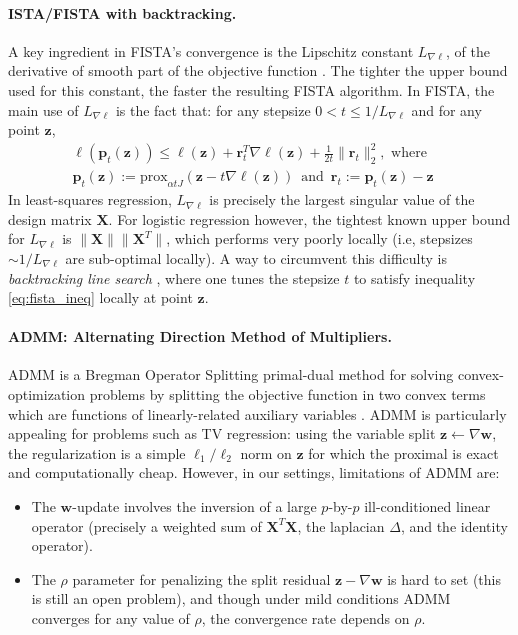 \paragraph{ISTA/FISTA with backtracking.}
A key ingredient in FISTA's convergence is the Lipschitz
constant $L_{\nabla \ell}$, of the derivative of smooth part of the objective function
. The tighter the upper bound used for this constant,
the faster the resulting FISTA algorithm. In FISTA, the main use of 
$L_{\nabla \ell}$ is the fact that: for any
stepsize $0 < t \le 1/L_{\nabla \ell}$ and for any point $\mathbf{z}$,
\begin{equation}%
  \begin{gathered}
    \ell(\mathbf{p}_{t}(\mathbf{z})) \le
    \ell(\mathbf{z}) + \mathbf{r}_{t}^T\nabla
    \ell(\mathbf{z}) + \frac{1}{2t} \|\mathbf{r}_{t}\|_{2}^2,
    \text{  where} \quad\\
    \mathbf{p}_{t}(\mathbf{z}) := \textrm{prox}_{\alpha t J}(\mathbf{z} - t
    \nabla \ell(\mathbf{z})) \,\text{  and  }\,
    \mathbf{r}_{t} :=
    \mathbf{p}_{t}(\mathbf{z}) - \mathbf{z} \quad
  \end{gathered}
  \label{eq:fista_ineq}
\end{equation}
In least-squares regression, $L_{\nabla \ell}$ is precisely the largest
singular value of the design matrix $\mathbf{X}$.
For logistic
regression however, the tightest known upper bound for
$L_{\nabla \ell}$ is $\|\mathbf{X}\|\|\mathbf{X}^T\|$,
which performs very poorly locally (i.e, stepsizes $\sim 1 / L_{\nabla \ell}$ are
sub-optimal locally). A way to circumvent this difficulty is
\emph{backtracking line search}  \citep{beck2009a}, where one tunes the
stepsize $t$ to satisfy inequality \eqref{eq:fista_ineq} locally at
point $\mathbf{z}$. 


\paragraph{ADMM: Alternating Direction Method of Multipliers.}
ADMM is a Bregman Operator Splitting primal-dual method for
solving convex-optimization problems by splitting the
objective function in two convex terms which are functions of linearly-related auxiliary variables
 \citep{boyd2010}.  ADMM is particularly appealing for problems such as TV
regression: using the variable split $\mathbf{z}
\leftarrow \nabla \mathbf{w}$, the regularization is a simple $\ell_{1}/\ell_2$
norm on $\mathbf{z}$ for which the proximal is exact and computationally
cheap. However, in our settings, limitations of ADMM are:
\begin{itemize}
\item The $\mathbf{w}$-update involves the inversion of a large $p$-by-$p$
  ill-conditioned linear operator (precisely a weighted sum of
  $\mathbf{X}^T\mathbf{X}$, the laplacian $\Delta$, and the identity
  operator).
\item The $\rho$ parameter for penalizing the split
  residual $\mathbf{z} - \nabla \mathbf{w}$ is hard to set (this is still an
  open problem), and though under mild conditions ADMM
  converges for any value of $\rho$, the convergence rate depends
  on $\rho$.
\end{itemize}

